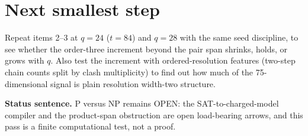 \documentclass[11pt]{article}
\begin{document}
\section*{Next smallest step}
Repeat items 2--3 at $q=24$ ($t=84$) and $q=28$ with the same seed discipline, to see whether the order-three increment beyond the pair span shrinks, holds, or grows with $q$. Also test the increment with ordered-resolution features (two-step chain counts split by clash multiplicity) to find out how much of the 75-dimensional signal is plain resolution width-two structure.

\bigskip
\noindent\textbf{Status sentence.} P versus NP remains OPEN: the SAT-to-charged-model compiler and the product-span obstruction are open load-bearing arrows, and this pass is a finite computational test, not a proof.
\end{document}
